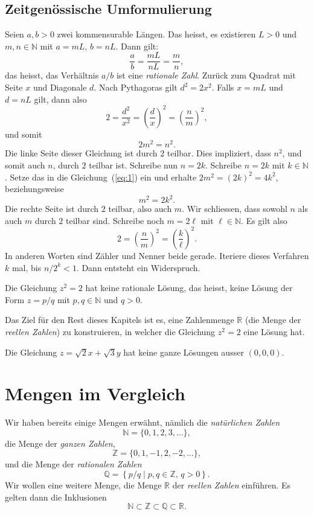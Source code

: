 \documentclass[../main.tex]{subfiles}
\begin{document}
\subsection*{Zeitgenössische Umformulierung}
Seien $a,b > 0$ zwei kommensurable Längen. Das heisst, es existieren $L > 0$
und $m,n \in \mathbb N$ mit $a = mL$, $b= nL$. Dann gilt:
\[\frac{a}{b} = \frac{mL}{nL} = \frac{m}{n},\]
das heisst, das Verhältnis $a/b$ ist eine \emph{rationale Zahl}.
Zurück zum Quadrat mit Seite $x$ und Diagonale $d$. Nach Pythagoras
gilt $d^{2} = 2x^{2}$. Falls $x=mL$ und $d=nL$ gilt,
dann also
\[2 = \frac{d^{2}}{x^{2}} = {\left( \frac{d}{x}\right)}^{2} = {\left(\frac{n}{m}\right)}^{2},\]
und somit
\begin{equation}
  \label{eq:1}
2m^{2} = n^{2}.
\end{equation}
Die linke Seite dieser Gleichung ist durch $2$ teilbar. Dies impliziert, dass $n^{2}$, und
somit auch $n$, durch $2$ teilbar ist. Schreibe nun $n = 2k$. Schreibe $n = 2k$ mit
$k \in \mathbb N$. Setze das in die Gleichung~(\ref{eq:1}) ein und erhalte
$2m^{2} = {(2k)}^{2} = 4k^{2}$,
beziehungsweise
\[m^{2} = 2k^{2}.\]
Die rechte Seite ist durch $2$ teilbar, also auch $m$.
Wir schliessen, dass sowohl $n$ als auch $m$ durch $2$ teilbar sind.
Schreibe noch $m = 2\ell$ mit $\ell \in \mathbb N$. Es gilt also
\[ 2 = {\left(\frac{n}{m}\right)}^{2}
  = {\left(\frac{k}{\ell}\right)}^{2}.\]
In anderen Worten sind Zähler und Nenner beide gerade.
Iteriere dieses Verfahren $k$ mal, bis $n/2^{k} < 1$. Dann entsteht ein Widerspruch.

\begin{corollary}
  Die Gleichung $z^{2} = 2$ hat keine rationale Lösung, das heisst,
  keine Lösung der Form $z = p/q$ mit $p, q \in \mathbb N$ und $q > 0$.
\end{corollary}

Das Ziel für den Rest dieses Kapitels ist es, eine Zahlenmenge $\mathbb R$ (die Menge
der \emph{reellen Zahlen}) zu konstruieren, in welcher die Gleichung
$z^{2} = 2$ eine Lösung hat.

\begin{exercise}
  Die Gleichung $z = \sqrt 2 x + \sqrt 3 y$ hat keine ganze Lösungen ausser $(0,0,0)$.
\end{exercise}

\section{Mengen im Vergleich}
Wir haben bereits einige Mengen erwähnt, nämlich die \emph{natürlichen Zahlen}
\[ \mathbb N = \{0, 1, 2, 3, \dots\},\]
die Menge der \emph{ganzen Zahlen},
\[ \mathbb Z = \{0, 1, -1, 2, -2, \dots\},\]
und die Menge der \emph{rationalen Zahlen}
\[ \mathbb Q = \left\{p/q \mid p, q \in \mathbb Z, \, q > 0\right\}.\]
Wir wollen eine weitere Menge, die Menge $\mathbb R$ der \emph{reellen Zahlen}
einführen. Es gelten dann die Inklusionen
\[\mathbb N \subset \mathbb Z \subset \mathbb Q \subset \mathbb R.\]
\end{document}
